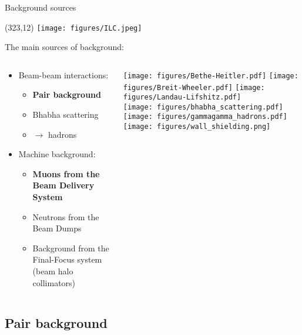 \documentclass[xcolor={dvipsnames}]{beamer}
\newcommand{\ilclogo}{
  \setlength{\TPHorizModule}{1pt}
  \setlength{\TPVertModule}{1pt}
  \begin{textblock}{1}(323,12)
   \texttt{[image: figures/ILC.jpeg]}
  \end{textblock}
}
\begin{document}
\begin{frame}{Background sources}
\ilclogo
The main sources of background:
\begin{columns}
 \begin{column}{0.6\textwidth}
  \begin{itemize}
    \item Beam-beam interactions:
    \begin{itemize}
      \item \textbf{Pair background}
      \item Bhabha scattering
      \item \textgamma \textgamma $\rightarrow$ hadrons
    \end{itemize}
    \vspace*{0.5cm}
    \item Machine background:
    \begin{itemize}
      \item \textbf{Muons from the Beam Delivery System}
      \item Neutrons from the Beam Dumps
      \item Background from the Final-Focus system (beam halo collimators)
    \end{itemize}
  \end{itemize}
 \end{column}
 \begin{column}{0.45\textwidth}
 \texttt{[image: figures/Bethe-Heitler.pdf]}
 \texttt{[image: figures/Breit-Wheeler.pdf]}
 \texttt{[image: figures/Landau-Lifshitz.pdf]}\\
 \texttt{[image: figures/bhabha\_scattering.pdf]} 
 \texttt{[image: figures/gammagamma\_hadrons.pdf]}\\
 \vspace*{0.5cm}
 \texttt{[image: figures/wall\_shielding.png]}
 \end{column}
\end{columns}
\end{frame}


\subsection{Pair background}
\end{document}

